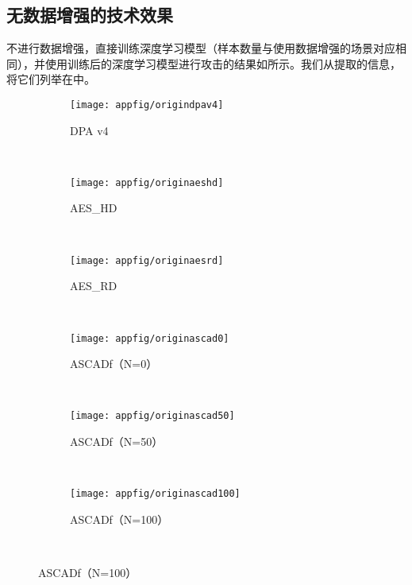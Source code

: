 {	\subsection{无数据增强的技术效果}
	不进行数据增强，直接训练深度学习模型（样本数量与使用数据增强的场景对应相同），并使用训练后的深度学习模型进行攻击的结果如所示。我们从提取\chenggongtiaoshu 的信息，将它们列举在中。
	
	\begin{figure}[!h]
		\centering
		\begin{subfigure}[b]{\trif\textwidth}
			\texttt{[image: appfig/origindpav4]}
			\caption{DPA v4}
			\label{fig:origindpav4}
		\end{subfigure}%
		~%
		\begin{subfigure}[b]{\trif\textwidth}
			\texttt{[image: appfig/originaeshd]}
			\caption{AES\_HD}
			\label{fig:originaeshd}
		\end{subfigure}
		~%
		\begin{subfigure}[b]{\trif\textwidth}
			\texttt{[image: appfig/originaesrd]}
			\caption{AES\_RD}
			\label{fig:originaesrd}
		\end{subfigure}
		\\%
		\begin{subfigure}[b]{\trif\textwidth}
			\texttt{[image: appfig/originascad0]}
			\caption{ASCADf（N=0）}
			\label{fig:originascad0}
		\end{subfigure}%
		~%
		\begin{subfigure}[b]{\trif\textwidth}
			\texttt{[image: appfig/originascad50]}
			\caption{ASCADf（N=50）}
			\label{fig:originascad50}
		\end{subfigure}
		~%
		\begin{subfigure}[b]{\trif\textwidth}
			\texttt{[image: appfig/originascad100]}
			\caption{ASCADf（N=100）}
			\label{fig:originascad100}
		\end{subfigure}
		\\%
		\label{appfig:origindlsca}
	\end{figure}
	
}

